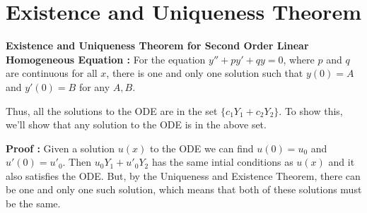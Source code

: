\section{Existence and Uniqueness Theorem}

\begin{mdframed}
\begin{center}
{\bf Existence and Uniqueness Theorem for Second Order Linear Homogeneous Equation : }
For the equation $y'' + py' + qy = 0$, where $p$ and $q$ are continuous for all $x$, 
there is one and only one solution such that $y(0) = A$ and $y'(0) = B$ for any $A, B$.
\end{center}
\end{mdframed}


Thus, all the solutions to the ODE are in the set $\{ c_1 Y_1 + c_2 Y_2 \}$.
To show this, we'll show that any solution to the ODE is in the above set.

{\bf Proof : } Given a solution $u(x)$ to the ODE we can find $u(0) = u_0$ and $u'(0) = u'_0$.
Then $u_0 Y_1 + u'_0 Y_2$ has the same intial conditions as $u(x)$
and it also satisfies the ODE. But, by the Uniqueness and Existence Theorem, 
there can be one and only one such solution, which means that both of these solutions must be the same.
